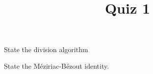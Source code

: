 \documentclass{exam}
\title{Quiz 1}
\begin{document}
\maketitle

\begin{questions}
  \question[5] State the division algorithm

  \question[5]  State the M\'eziriac-B\'ezout identity.


\end{questions}
\end{document}
